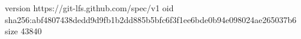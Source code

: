 version https://git-lfs.github.com/spec/v1
oid sha256:abf4807438dedd9d9fb1b2dd885b5bfc6f3f1ee6bde0b94e098024ae265037b6
size 43840
